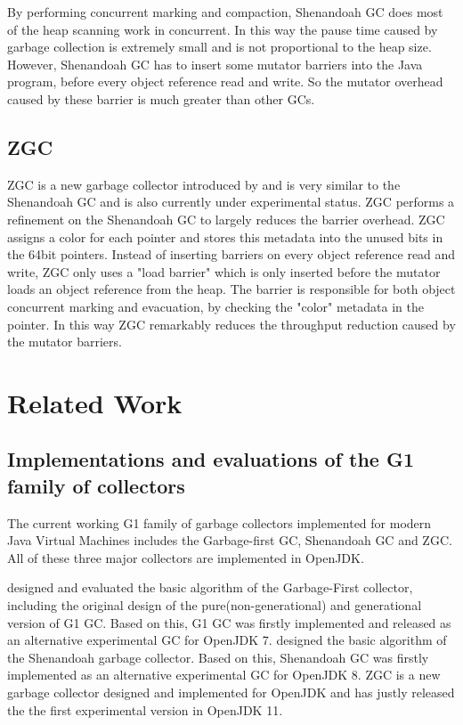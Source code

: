 By performing concurrent marking and compaction, Shenandoah GC does most of the
heap scanning work in concurrent. In this way the pause time caused by garbage collection
is extremely small and is not proportional to the heap size.
However, Shenandoah GC has to insert some mutator barriers into the Java program,
before every object reference read and write. So the mutator overhead caused by
these barrier is much greater than other GCs.

\subsection{ZGC}

ZGC is a new garbage collector introduced by \cite{liden_karlsson_2018} and
is very similar to the Shenandoah GC and is also currently under experimental status.
ZGC performs a refinement on the Shenandoah GC to largely reduces the barrier
overhead.
ZGC assigns a color for each pointer and stores this metadata into the
unused bits in the 64bit pointers.
Instead of inserting barriers on every object reference read and write,
ZGC only uses a "load barrier" which is only inserted before the mutator loads an
object reference from the heap. The barrier is responsible for both object concurrent marking
and evacuation, by checking the "color" metadata in the pointer.
In this way ZGC remarkably reduces the throughput reduction caused by the mutator
barriers.

\section{Related Work}
\label{sec:relatedwork}

\subsection{Implementations and evaluations of the G1 family of collectors}

The current working G1 family of garbage collectors implemented for modern Java Virtual Machines
includes the Garbage-first GC, Shenandoah GC and ZGC.
All of these three major collectors are implemented in OpenJDK.

\cite{detlefs2004garbage} designed and evaluated the basic algorithm of the Garbage-First collector,
including the original design of the pure(non-generational) and generational version
of G1 GC. Based on this, G1 GC was firstly implemented and released as an alternative
experimental GC for OpenJDK 7. \cite{flood2016shenandoah} designed the basic algorithm
of the Shenandoah garbage collector.
Based on this, Shenandoah GC was firstly implemented as an alternative experimental GC for OpenJDK 8.
ZGC is a new garbage collector designed and implemented for OpenJDK
and has justly released the the first experimental version in OpenJDK 11.

